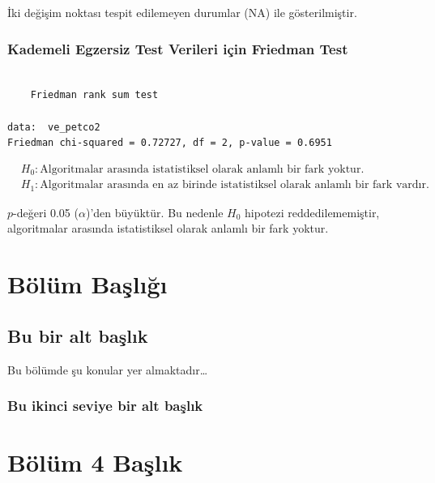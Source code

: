 \documentclass[12pt,twoside]{deuthesis}
\begin{document}
İki değişim noktası tespit edilemeyen durumlar (NA) ile gösterilmiştir.

\hypertarget{kademeli-egzersiz-test-verileri-iuxe7in-friedman-test}{%
\subsection{Kademeli Egzersiz Test Verileri için Friedman Test}\label{kademeli-egzersiz-test-verileri-iuxe7in-friedman-test}}

\begin{verbatim}

    Friedman rank sum test

data:  ve_petco2
Friedman chi-squared = 0.72727, df = 2, p-value = 0.6951
\end{verbatim}

\begin{align*}
& H_0: \text{Algoritmalar arasında istatistiksel olarak anlamlı bir fark yoktur.} \\
& H_1: \text{Algoritmalar arasında en az birinde istatistiksel olarak anlamlı bir fark vardır.}
\end{align*}

\(p\)-değeri 0.05 (\(\alpha\))'den büyüktür. Bu nedenle \(H_0\) hipotezi reddedilememiştir, algoritmalar arasında istatistiksel olarak anlamlı bir fark yoktur.

\hypertarget{Bolum4}{%
\chapter{Bölüm Başlığı}\label{Bolum4}}

\hypertarget{bu-bir-alt-baux15flux131k}{%
\section{Bu bir alt başlık}\label{bu-bir-alt-baux15flux131k}}

Bu bölümde şu konular yer almaktadır\ldots{}

\hypertarget{bu-ikinci-seviye-bir-alt-baux15flux131k}{%
\subsection{Bu ikinci seviye bir alt başlık}\label{bu-ikinci-seviye-bir-alt-baux15flux131k}}

\hypertarget{Bolum5}{%
\chapter{Bölüm 4 Başlık}\label{Bolum5}}
\end{document}
